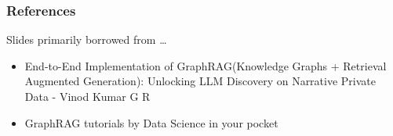 \begin{frame}[fragile]\frametitle{References}
Slides primarily borrowed from \ldots

\begin{itemize}
\item End-to-End Implementation of GraphRAG(Knowledge Graphs + Retrieval Augmented Generation): Unlocking LLM Discovery on Narrative Private Data - Vinod Kumar G R
\item GraphRAG tutorials by Data Science in your pocket
\end{itemize}

\end{frame}
